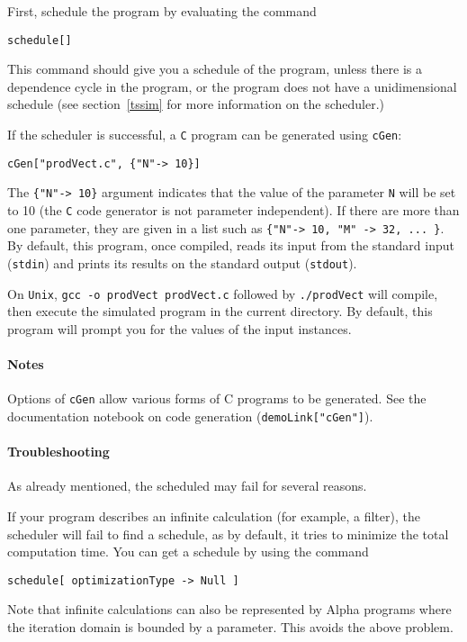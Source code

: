 \documentclass[12pt]{article}
\newcommand{\C}{\texttt{C}}
\newcommand{\Alpha}{{\sc Alpha}}
\newcommand{\alfa}{\Alpha}
\begin{document}
First, schedule
the program by evaluating the command
\begin{verbatim}
schedule[]
\end{verbatim}
This command should give you a schedule of the program, 
unless there is a dependence cycle in the program, or the program
does not have a unidimensional schedule (see section~\ref{tssim} for
more information on the scheduler.)

If the scheduler is successful, a \C{} program can be generated using
\texttt{cGen}:
\begin{verbatim}
cGen["prodVect.c", {"N"-> 10}]
\end{verbatim}
The \texttt{\{"N"-> 10\}}
argument indicates that the value of the parameter {\tt N} will be set
to 10 (the {\tt C} code generator is not parameter independent).
If there are more than one parameter, they are given in a list 
such as \texttt{\{"N"-> 10, "M" -> 32, ... \}}. 
By default, this program, once compiled, reads its input from the
standard input ({\tt stdin}) and prints its results on the 
standard output ({\tt stdout}). 

On \texttt{Unix}, \texttt{gcc -o prodVect prodVect.c} followed by
\texttt{./prodVect} will compile, then execute the simulated
program in the current directory. By default, this program 
will prompt you for the values of the input instances. 

\paragraph*{Notes}
Options of \texttt{cGen} allow various forms of C programs 
to be generated. See the documentation notebook on 
code generation (\texttt{demoLink["cGen"]}).

\paragraph*{Troubleshooting}
\label{tssim}
As already mentioned, the scheduled may fail for several 
reasons.

If your program describes an infinite calculation (for
example, a filter), the scheduler will fail to find 
a schedule, as by default, it tries to minimize the total
computation time. You can get a schedule by using the
command
\begin{verbatim}
schedule[ optimizationType -> Null ]
\end{verbatim}
Note that infinite calculations can also be represented
by \alfa{} programs where the iteration domain is bounded by
a parameter. This avoids the above problem. 
\end{document}
